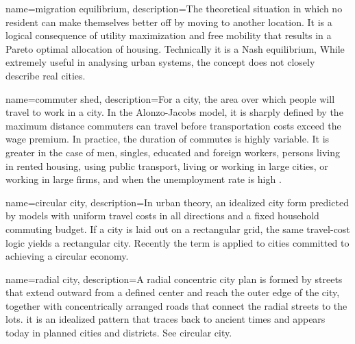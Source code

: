 {
name=migration equilibrium,
description={The theoretical situation in which no resident can  make themselves better off by moving to another location. It is a logical consequence of utility maximization and free mobility that results in a Pareto optimal allocation of housing. Technically it is a Nash equilibrium, While extremely useful in analysing urban systems, the concept does not closely describe real cities.
}
}

{
name=commuter shed,
description={For a city, the area over which people will travel to work in a city. In the \gls{Alonzo-Jacobs model}, it is sharply defined by the maximum distance commuters can travel before transportation costs exceed the wage premium. In  practice, the duration of commutes is highly variable. It is greater in the case of men, singles, educated and foreign workers, persons living in rented housing, using public transport, living or working in large cities, or working in large firms,  and when the  unemployment rate is high\cite{axisaFactorsInfluencingCommute2012} .}
}

{
name=circular city,
description={In urban theory, an idealized city form predicted by models with uniform travel costs in all directions and a fixed household commuting budget. If a city is laid out on a rectangular grid, the same travel-cost logic yields a rectangular city. Recently the term is applied to cities committed to achieving a circular economy. }
}

{
name=radial city,
description={A radial concentric city plan is formed by streets that extend outward from a defined center and reach the outer edge of the city, together with concentrically arranged roads that connect the radial streets to the lots. it is an idealized pattern that traces back to ancient times and appears  today in planned cities and districts. See \gls{circular city}.}
}



